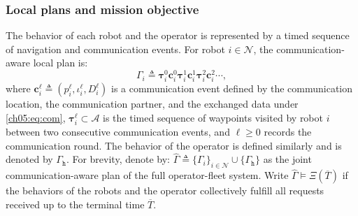 \subsubsection{Local plans and mission objective}
\label{ch05:subsec:problem}

The behavior of each robot and the operator is represented by a timed sequence
of navigation and communication events. For robot $i \in \mathcal{N}$, the
communication-aware local plan is:
\begin{equation}
\Gamma_i \triangleq
\boldsymbol{\tau}_i^0 \mathbf{c}_i^0
\boldsymbol{\tau}_i^1 \mathbf{c}_i^1
\boldsymbol{\tau}_i^2 \mathbf{c}_i^2 \cdots,
\label{ch05:eq:plan}
\end{equation}
where $\mathbf{c}_i^\ell \triangleq
(p_i^\ell, \iota_i^\ell, D_i^\ell)$ is a communication event defined by the
communication location, the communication partner, and the exchanged data under
\eqref{ch05:eq:com}, $\boldsymbol{\tau}_i^\ell \subset \mathcal{A}$ is the
timed sequence of waypoints visited by robot $i$ between two consecutive
communication events, and $\ell \geq 0$ records the communication round.
The behavior of the operator is defined similarly and is denoted by
$\Gamma_{\texttt{h}}$. For brevity, denote by:
$\widehat{\Gamma} \triangleq
\{\Gamma_i\}_{i \in \mathcal{N}} \cup \{\Gamma_{\texttt{h}}\}$
as the joint communication-aware plan of the full operator-fleet system.
Write $\widehat{\Gamma} \models \Xi(\overline{T})$ if the behaviors of the
robots and the operator collectively fulfill all requests received up to the
terminal time $\overline{T}$.


